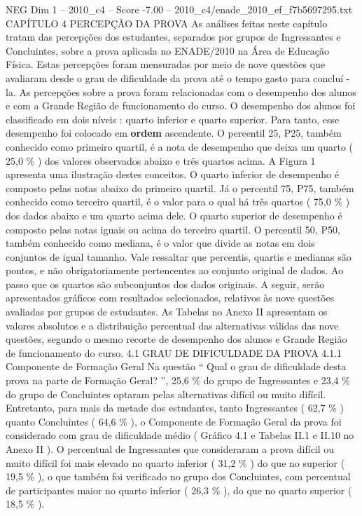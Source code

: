 \begin{textsample}{NEG Dim 1 – 2010\_c4 – Score -7.00 – 2010\_c4/enade\_2010\_ef\_f7b5697295.txt}  \label{ex:f1_neg_036}
CAPÍTULO 4 PERCEPÇÃO DA PROVA As análises feitas neste capítulo tratam das percepções dos estudantes, separados por grupos de Ingressantes e Concluintes, sobre a prova aplicada no ENADE/2010 na Área de Educação Física.
Estas percepções foram mensuradas por meio de nove questões que avaliaram desde o grau de dificuldade da prova até o tempo gasto para concluí -la.
As percepções sobre a prova foram relacionadas com o desempenho dos alunos e com a Grande Região de funcionamento do curso.
O desempenho dos alunos foi classificado em dois níveis : quarto inferior e quarto superior.
Para tanto, esse desempenho foi colocado em \textbf{ordem} ascendente.
O percentil 25, P25, também conhecido como primeiro quartil, é a nota de desempenho que deixa um quarto ( 25,0 \% ) dos valores observados abaixo e três quartos acima.
A Figura 1 apresenta uma ilustração destes conceitos.
O quarto inferior de desempenho é composto pelas notas abaixo do primeiro quartil.
Já o percentil 75, P75, também conhecido como terceiro quartil, é o valor para o qual há três quartos ( 75,0 \% ) dos dados abaixo e um quarto acima dele.
O quarto superior de desempenho é composto pelas notas iguais ou acima do terceiro quartil.
O percentil 50, P50, também conhecido como mediana, é o valor que divide as notas em dois conjuntos de igual tamanho.
Vale ressaltar que percentis, quartis e medianas são pontos, e não obrigatoriamente pertencentes ao conjunto original de dados.
Ao passo que os quartos são subconjuntos dos dados originais.
A seguir, serão apresentados gráficos com resultados selecionados, relativos às nove questões avaliadas por grupos de estudantes.
As Tabelas no Anexo II apresentam os valores absolutos e a distribuição percentual das alternativas válidas das nove questões, segundo o mesmo recorte de desempenho dos alunos e Grande Região de funcionamento do curso. 4.1 GRAU DE DIFICULDADE DA PROVA 4.1.1 Componente de Formação Geral Na questão “ Qual o grau de dificuldade desta prova na parte de Formação Geral? ”, 25,6 \% do grupo de Ingressantes e 23,4 \% do grupo de Concluintes optaram pelas alternativas difícil ou muito difícil.
Entretanto, para mais da metade dos estudantes, tanto Ingressantes ( 62,7 \% ) quanto Concluintes ( 64,6 \% ), o Componente de Formação Geral da prova foi considerado com grau de dificuldade médio ( Gráfico 4.1 e Tabelas II.1 e II.10 no Anexo II ).
O percentual de Ingressantes que consideraram a prova difícil ou muito difícil foi mais elevado no quarto inferior ( 31,2 \% ) do que no superior ( 19,5 \% ), o que também foi verificado no grupo dos Concluintes, com percentual de participantes maior no quarto inferior ( 26,3 \% ), do que no quarto superior ( 18,5 \% ).

\end{textsample}
